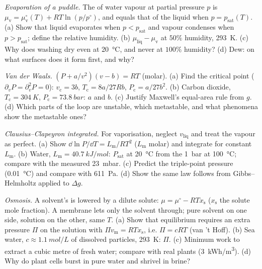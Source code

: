 \begin{exercise}[$\star\star$]\label{exo:b2:thermodynamic-potentials:8}
\emph{Evaporation of a puddle.} The  of water vapour
at partial pressure $p$ is $\mu_{\text{v}} = \mu_{\text{v}}^\circ(T) +
RT\ln(p/p^\circ)$, and equals that of the liquid when $p = p_{\text{sat}}(T)$.
(a) Show that liquid evaporates when $p < p_{\text{sat}}$ and vapour
condenses when $p > p_{\text{sat}}$; define the relative humidity. (b)
$\mu_{\text{liq}} - \mu_{\text{v}}$ at $50\%$ humidity, \qty{293}{K}. (c) Why
does washing dry even at \qty{20}{\celsius}, and never at $100\%$ humidity?
(d) Dew: on what surfaces does it form first, and why?
\end{exercise}

\begin{exercise}[$\star\star$]\label{exo:b2:thermodynamic-potentials:9}
\emph{Van der Waals.} $(P + a/v^2)(v - b) = RT$ (molar). (a) Find the
critical point ($\partial_vP = \partial_v^2P = 0$): $v_{\text{c}} = 3b$,
$T_{\text{c}} = 8a/27Rb$, $P_{\text{c}} = a/27b^2$. (b) Carbon dioxide,
$T_{\text{c}} = \qty{304}{K}$, $P_{\text{c}} = \qty{73.8}{bar}$: $a$ and $b$. (c)
Justify Maxwell's equal-area rule from $g$. (d) Which parts of the loop
are unstable, which metastable, and what phenomena show the metastable
ones?
\end{exercise}

\begin{exercise}[$\star\star\star$]\label{exo:b2:thermodynamic-potentials:10}
\emph{Clausius--Clapeyron integrated.} For vaporisation, neglect $v_{\text{liq}}$
and treat the vapour as perfect. (a) Show $\dd\ln P/\dd T = L_{\text{m}}/RT^2$
($L_{\text{m}}$ molar) and integrate for constant $L_{\text{m}}$. (b) Water,
$L_{\text{m}} = \qty{40.7}{kJ/mol}$: $P_{\text{sat}}$ at \qty{20}{\celsius} from the
\qty{1}{bar} at \qty{100}{\celsius}; compare with the measured \qty{23}{mbar}.
(c) Predict the triple-point pressure (\qty{0.01}{\celsius}) and compare
with \qty{611}{Pa}. (d) Show the same law follows from Gibbs--Helmholtz
applied to $\Delta g$.
\end{exercise}

\begin{exercise}[$\star\star\star$]\label{exo:b2:thermodynamic-potentials:11}
\emph{Osmosis.} A solvent's  is lowered by a dilute
solute: $\mu = \mu^\circ - RTx_{\text{s}}$ ($x_{\text{s}}$ the solute mole
fraction). A membrane lets only the solvent through; pure solvent on
one side, solution on the other, same $T$. (a) Show that equilibrium
requires an extra pressure $\Pi$ on the solution with $\Pi v_{\text{m}} =
RTx_{\text{s}}$, i.e. $\Pi = cRT$ (van 't Hoff). (b) Sea water, $c \approx
\qty{1.1}{mol/L}$ of dissolved particles, \qty{293}{K}: $\Pi$. (c) Minimum
work to extract a cubic metre of fresh water; compare with real plants
(\qty{3}{kWh/m^3}). (d) Why do plant cells burst in pure water and
shrivel in brine?
\end{exercise}

